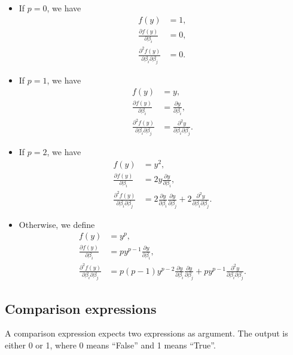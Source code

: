 \documentclass[12pt,a4paper]{article}
\begin{document}
\begin{description}
  \begin{itemize}
\item If $p=0$, we have
 \begin{align*}
    f(y)& = 1, \\ 
    \frac{\partial f(y)}{\partial \beta_i} &= 0, \\
    \frac{\partial^2 f(y)}{\partial \beta_i \partial \beta_j} &= 0.
      \end{align*}
\item If $p = 1$, we have
      \begin{align*}
    f(y)& = y, \\ 
    \frac{\partial f(y)}{\partial \beta_i} &= \frac{\partial y}{\partial \beta_i}, \\
    \frac{\partial^2 f(y)}{\partial \beta_i \partial \beta_j} &=   \frac{\partial^2 y}{\partial \beta_i \partial \beta_j}.
      \end{align*}
\item If $p = 2$, we have
      \begin{align*}
    f(y)& = y^2, \\ 
    \frac{\partial f(y)}{\partial \beta_i} &= 2 y \frac{\partial y}{\partial \beta_i}, \\
    \frac{\partial^2 f(y)}{\partial \beta_i \partial \beta_j} &= 2  \frac{\partial y}{\partial \beta_i} \frac{\partial y}{\partial \beta_j} +  2 \frac{\partial^2 y}{\partial \beta_i \partial \beta_j}.
    \end{align*}
\item Otherwise, we define
      \begin{align*}
    f(y)& = y^p, \\ 
    \frac{\partial f(y)}{\partial \beta_i} &= p y^{p-1} \frac{\partial y}{\partial \beta_i}, \\
    \frac{\partial^2 f(y)}{\partial \beta_i \partial \beta_j} &= p (p-1) y^{p-2} \frac{\partial y}{\partial \beta_i} \frac{\partial y}{\partial \beta_j} +  p y^{p-1} \frac{\partial^2 y}{\partial \beta_i \partial \beta_j}.
      \end{align*}

\end{itemize}


\end{description}
  




\subsection{Comparison expressions}
A comparison expression expects two expressions as argument. The output  is either 0 or 1, where 0 means ``False'' and 1 means ``True''. 
  
\end{document}
